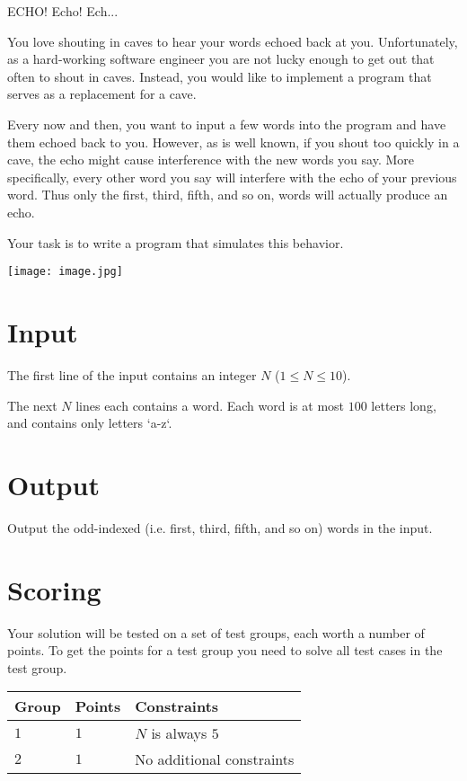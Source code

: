 ECHO! Echo! Ech...

You love shouting in caves to hear your words echoed back at you.
Unfortunately, as a hard-working software engineer you are not lucky enough to get out that often to shout in caves.
Instead, you would like to implement a program that serves as a replacement for a cave.

Every now and then, you want to input a few words into the program and have them echoed back to you.
However, as is well known, if you shout too quickly in a cave, the echo might cause interference with the new words you say.
More specifically, every other word you say will interfere with the echo of your previous word.
Thus only the first, third, fifth, and so on, words will actually produce an echo.

Your task is to write a program that simulates this behavior.

\texttt{[image: image.jpg]}

\section*{Input}
The first line of the input contains an integer \(N\) (\(1 \le N \le 10\)).

The next \(N\) lines each contains a word.
Each word is at most \(100\) letters long, and contains only letters `a-z`.

\section*{Output}
Output the odd-indexed (i.e. first, third, fifth, and so on) words in the input.

\section*{Scoring}
Your solution will be tested on a set of test groups, each worth a number of points.
To get the points for a test group you need to solve all test cases in the test group.

\noindent
\begin{tabular}{| l | l | l |}
  \hline
  Group & Points & Constraints \\ \hline
  $1$    & $1$         &  $N$ is always $5$ \\ \hline
  $2$    & $1$        &  No additional constraints \\ \hline
\end{tabular}
